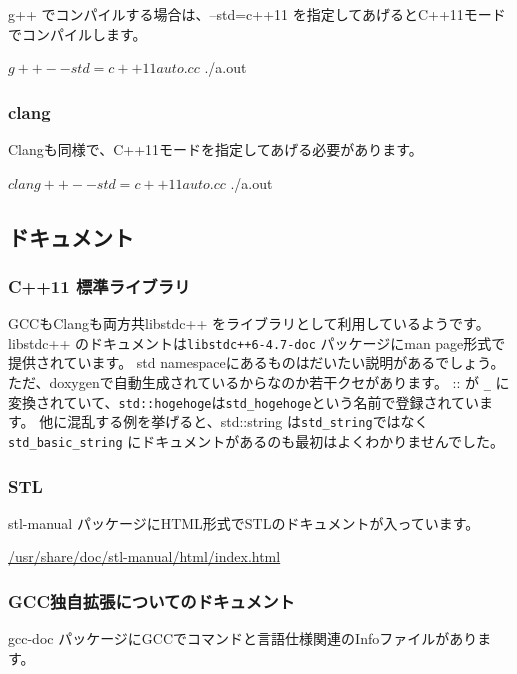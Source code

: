 \documentclass[mingoth,a4paper]{jsarticle}
\begin{document}
g++ でコンパイルする場合は、--std=c++11 を指定してあげるとC++11モードでコンパイルします。

\begin{commandline}
$ g++ --std=c++11 auto.cc
$ ./a.out
\end{commandline}

\subsubsection{clang}

Clangも同様で、C++11モードを指定してあげる必要があります。

\begin{commandline}
$ clang++ --std=c++11 auto.cc 
$ ./a.out
\end{commandline}

\subsection{ドキュメント}

\subsubsection{C++11 標準ライブラリ}

GCCもClangも両方共libstdc++ をライブラリとして利用しているようです。
libstdc++ のドキュメントは\texttt{libstdc++6-4.7-doc} パッケージにman
page形式で提供されています。
std namespaceにあるものはだいたい説明があるでしょう。
ただ、doxygenで自動生成されているからなのか若干クセがあります。
:: が \verb!_! に変換されていて、\verb!std::hogehoge!は\verb!std_hogehoge!という名前で登録されています。
他に混乱する例を挙げると、std::string は\verb!std_string!ではなく
\verb!std_basic_string! にドキュメントがあるのも最初はよくわかりませんでした。

\subsubsection{STL}

stl-manual パッケージにHTML形式でSTLのドキュメントが入っています。

\url{/usr/share/doc/stl-manual/html/index.html}

\subsubsection{GCC独自拡張についてのドキュメント}

gcc-doc パッケージにGCCでコマンドと言語仕様関連のInfoファイルがあります。
\end{document}
